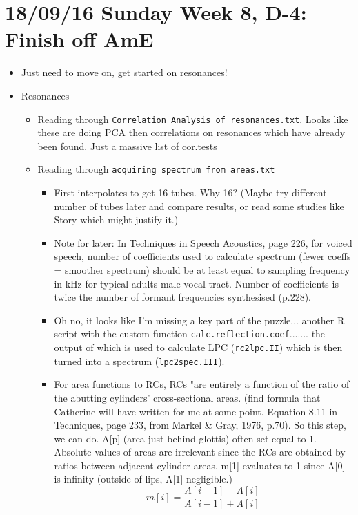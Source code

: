 \documentclass{article}
\begin{document}
\section*{18/09/16 Sunday Week 8, D-4: Finish off AmE}
\begin{itemize}
    \item Just need to move on, get started on resonances!
    \item Resonances
    \begin{itemize}
        \item Reading through \verb|Correlation Analysis of resonances.txt|. Looks like these are doing PCA then correlations on resonances which have already been found. Just a massive list of cor.tests
        \item Reading through \verb|acquiring spectrum from areas.txt|
        \begin{itemize}
            \item First interpolates to get 16 tubes. Why 16? (Maybe try different number of tubes later and compare results, or read some studies like Story which might justify it.)
            \item Note for later: In Techniques in Speech Acoustics, page 226, for voiced speech, number of coefficients used to calculate spectrum (fewer coeffs = smoother spectrum) should be at least equal to sampling frequency in kHz for typical adults male vocal tract. Number of coefficients is twice the number of formant frequencies synthesised (p.228).
            \item Oh no, it looks like I'm missing a key part of the puzzle... another R script with the custom function \verb|calc.reflection.coef|....... the output of which is used to calculate LPC (\verb|rc2lpc.II|) which is then turned into a spectrum (\verb|lpc2spec.III|).
            \item For area functions to RCs, RCs "are entirely a function of the ratio of the abutting cylinders' cross-sectional areas. (find formula that Catherine will have written for me at some point. Equation 8.11 in Techniques, page 233, from Markel \& Gray, 1976, p.70). So this step, we can do. A[p] (area just behind glottis) often set equal to 1. Absolute values of areas are irrelevant since the RCs are obtained by ratios between adjacent cylinder areas. m[1] evaluates to 1 since A[0] is infinity (outside of lips, A[1] negligible.)
            \begin{equation}
                m[i] = \frac{A[i - 1] - A[i]}{A[i-1] + A[i]}
            \end{equation}

\end{itemize}
\end{itemize}
\end{itemize}
\end{document}

